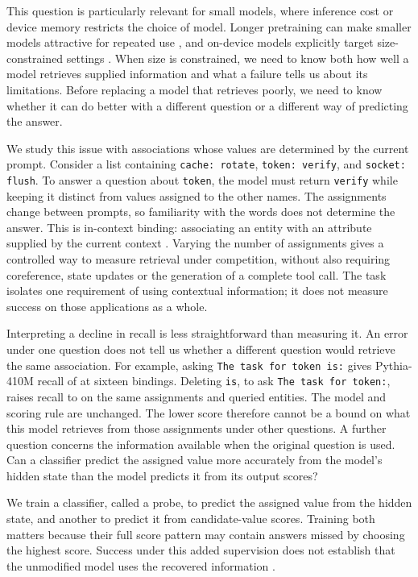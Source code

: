 \documentclass{article}
\begin{document}
This question is particularly relevant for small models, where inference cost or device memory restricts the choice of model.
Longer pretraining can make smaller models attractive for repeated use \citep{touvron2023}, and on-device models explicitly target size-constrained settings \citep{mobilellm2024}.
When size is constrained, we need to know both how well a model retrieves supplied information and what a failure tells us about its limitations.
Before replacing a model that retrieves poorly, we need to know whether it can do better with a different question or a different way of predicting the answer.

We study this issue with associations whose values are determined by the current prompt.
Consider a list containing \texttt{cache: rotate}, \texttt{token: verify}, and \texttt{socket: flush}.
To answer a question about \texttt{token}, the model must return \texttt{verify} while keeping it distinct from values assigned to the other names.
The assignments change between prompts, so familiarity with the words does not determine the answer.
This is in-context binding: associating an entity with an attribute supplied by the current context \citep{binding2310}.
Varying the number of assignments gives a controlled way to measure retrieval under competition, without also requiring coreference, state updates or the generation of a complete tool call.
The task isolates one requirement of using contextual information; it does not measure success on those applications as a whole.

Interpreting a decline in recall is less straightforward than measuring it.
An error under one question does not tell us whether a different question would retrieve the same association.
For example, asking \texttt{The task for token is:} gives Pythia-410M recall of \NewFourTenOriginal{} at sixteen bindings.
Deleting \texttt{is}, to ask \texttt{The task for token:}, raises recall to \NewFourTenColon{} on the same assignments and queried entities.
The model and scoring rule are unchanged.
The lower score therefore cannot be a bound on what this model retrieves from those assignments under other questions.
A further question concerns the information available when the original question is used.
Can a classifier predict the assigned value more accurately from the model's hidden state than the model predicts it from its output scores?

We train a classifier, called a probe, to predict the assigned value from the hidden state, and another to predict it from candidate-value scores.
Training both matters because their full score pattern may contain answers missed by choosing the highest score.
Success under this added supervision does not establish that the unmodified model uses the recovered information \citep{hewitt2019,belinkov2022}.
\end{document}
